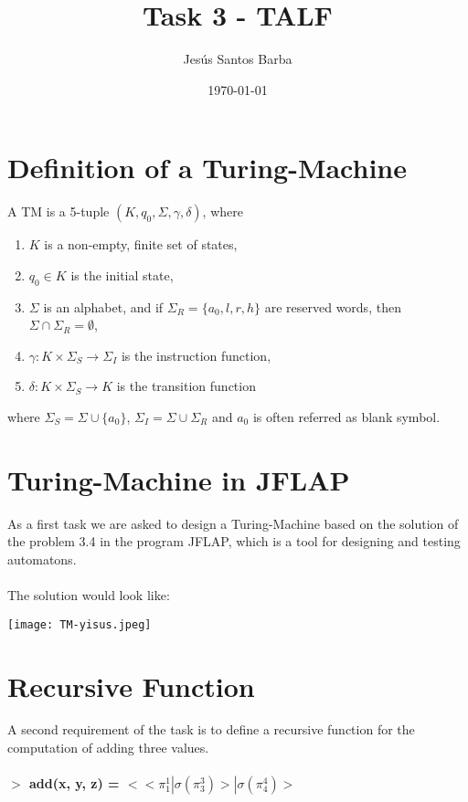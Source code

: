 \documentclass[11pt]{article}
\title{\textbf{Task 3 - TALF}}
\author{Jesús Santos Barba}
\date{\today}
\begin{document}
\maketitle
\thispagestyle{empty}

\section{Definition of a Turing-Machine}

A TM is a 5-tuple $(K, q_0, \Sigma, \gamma, \delta)$, where
\begin{enumerate}
	\item $K$ is a non-empty, finite set of states,
    \item $q_0 \in K$ is the initial state,
    \item $\Sigma$ is an alphabet, and if $\Sigma_{R}=\{a_0, l, r, h\}$ are reserved words, then $\Sigma \cap \Sigma_{R} = \emptyset$,
    \item $\gamma: K \times \Sigma_{S} \to \Sigma_{I}$ is the instruction function,
    \item $\delta: K \times \Sigma_{S}\to K$ is the transition function 
  \end{enumerate}
where $\Sigma_{S} = \Sigma \cup \{a_0\}$, $\Sigma_{I} = \Sigma \cup \Sigma_R$ and $a_0$ is often referred as blank symbol.\\


\section{Turing-Machine in JFLAP}

As a first task we are asked to design a Turing-Machine based on the solution of the problem 3.4 in the program JFLAP, which is a tool for designing and testing automatons.
\\\\
The solution would look like:
\begin{center}
	\texttt{[image: TM-yisus.jpeg]} 
\end{center}


\section{Recursive Function}
A second requirement of the task is to define a recursive function for the computation of adding three values.
\\\\
\textbf{ $>$ add(x, y, z) = $< <\pi_1^{1} | \sigma(\pi_3^{3})> | \sigma(\pi_4^{4}) >$ }
\end{document}
